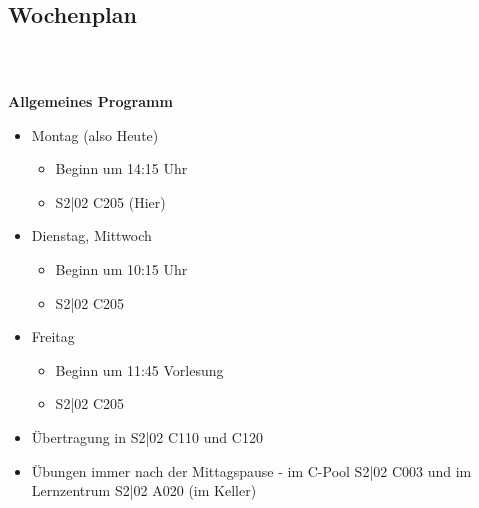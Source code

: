 \subsection{Wochenplan}
\begin{frame}
	\frametitle{\insertsectionhead \\ {\small \insertsubsectionhead}}
	\textbf{Allgemeines Programm}
	\begin{itemize}
		\item Montag (also Heute)
		\begin{itemize}
			\item Beginn um 14:15 Uhr
			\item S2|02 C205 (Hier)
		\end{itemize} 
		\item Dienstag, Mittwoch 
		\begin{itemize}
			\item Beginn um 10:15 Uhr
			\item S2|02 C205
		\end{itemize} 
		\item Freitag 
		\begin{itemize}
			\item Beginn um 11:45 Vorlesung
			\item S2|02 C205
		\end{itemize}
		\item Übertragung in S2|02 C110 und C120
		\item Übungen immer nach der Mittagspause - im C-Pool S2|02 C003 und im Lernzentrum S2|02 A020 (im Keller)
	\end{itemize}
\end{frame}

